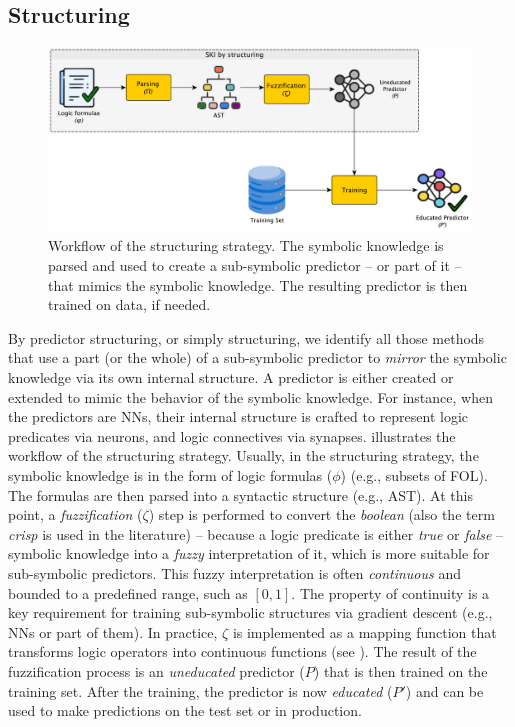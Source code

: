 \subsection{Structuring}\label{subsec:structuring}
%
\begin{figure}
    \centering
    \includegraphics[width=.9\linewidth]{figures/workflow-structuring}
    \caption[SKI workflow of structuring strategy]{
        Workflow of the structuring strategy.
        The symbolic knowledge is parsed and used to create a sub-symbolic predictor -- or part of it -- that mimics the symbolic knowledge.
        The resulting predictor is then trained on data, if needed.
    }
    \label{fig:workflow-structuring}
\end{figure}
%
By predictor structuring, or simply structuring, we identify all those methods that use a part (or the whole) of a sub-symbolic predictor to \emph{mirror} the symbolic knowledge via its own internal structure.
%
A predictor is either created or extended to mimic the behavior of the symbolic knowledge.
%
For instance, when the predictors are \glspl{NN}, their internal structure is crafted to represent logic predicates via neurons, and logic connectives via synapses.
%
 illustrates the workflow of the structuring strategy.
%
Usually, in the structuring strategy, the symbolic knowledge is in the form of logic formulas ($\phi$) (e.g., subsets of \gls{FOL}).
%
The formulas are then parsed into a syntactic structure (e.g., \gls{AST}).
%
At this point, a \emph{fuzzification} ($\zeta$) step is performed to convert the \emph{boolean} (also the term \emph{crisp} is used in the literature) -- because a logic predicate is either \emph{true} or \emph{false} -- symbolic knowledge into a \emph{fuzzy} interpretation of it, which is more suitable for sub-symbolic predictors.
%
This fuzzy interpretation is often \emph{continuous} and bounded to a predefined range, such as \([0, 1]\).
%
The property of continuity is a key requirement for training sub-symbolic structures via gradient descent (e.g., \glspl{NN} or part of them).
%
In practice, $\zeta$ is implemented as a mapping function that transforms logic operators into continuous functions (see ).
%
The result of the fuzzification process is an \emph{uneducated} predictor ($P$) that is then trained on the training set.
%
After the training, the predictor is now \emph{educated} ($P'$) and can be used to make predictions on the test set or in production.
%

